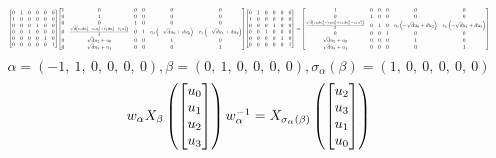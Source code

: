 \documentclass[11pt]{article}
\theoremstyle{definition}
\begin{document}
\[
\scaletoalign{\textwidth}{{\left[\begin{matrix}0 & 1 & 0 & 0 & 0 & 0\\1 & 0 & 0 & 0 & 0 & 0\\0 & 0 & 0 & 1 & 0 & 0\\0 & 0 & 1 & 0 & 0 & 0\\0 & 0 & 0 & 0 & 1 & 0\\0 & 0 & 0 & 0 & 0 & 1\end{matrix}\right]} {\left[\begin{matrix}1 & 0 & 0 & 0 & 0 & 0\\0 & 1 & 0 & 0 & 0 & 0\\0 & 0 & 1 & 0 & 0 & 0\\0 & \frac{\sqrt{d} \left(c_{0} d u_{2}^{2} - c_{0} u_{0}^{2} + c_{1} d u_{3}^{2} - c_{1} u_{1}^{2}\right)}{2} & 0 & 1 & c_{0} \left(- \sqrt{d} u_{0} + d u_{2}\right) & c_{1} \left(- \sqrt{d} u_{1} + d u_{3}\right)\\0 & \sqrt{d} u_{2} + u_{0} & 0 & 0 & 1 & 0\\0 & \sqrt{d} u_{3} + u_{1} & 0 & 0 & 0 & 1\end{matrix}\right]} {\left[\begin{matrix}0 & 1 & 0 & 0 & 0 & 0\\1 & 0 & 0 & 0 & 0 & 0\\0 & 0 & 0 & 1 & 0 & 0\\0 & 0 & 1 & 0 & 0 & 0\\0 & 0 & 0 & 0 & 1 & 0\\0 & 0 & 0 & 0 & 0 & 1\end{matrix}\right]} = {\left[\begin{matrix}1 & 0 & 0 & 0 & 0 & 0\\0 & 1 & 0 & 0 & 0 & 0\\\frac{\sqrt{d} \left(c_{0} d u_{2}^{2} - c_{0} u_{0}^{2} + c_{1} d u_{3}^{2} - c_{1} u_{1}^{2}\right)}{2} & 0 & 1 & 0 & c_{0} \left(- \sqrt{d} u_{0} + d u_{2}\right) & c_{1} \left(- \sqrt{d} u_{1} + d u_{3}\right)\\0 & 0 & 0 & 1 & 0 & 0\\\sqrt{d} u_{2} + u_{0} & 0 & 0 & 0 & 1 & 0\\\sqrt{d} u_{3} + u_{1} & 0 & 0 & 0 & 0 & 1\end{matrix}\right]}}
\]
\[
\alpha = \left( -1, \  1, \  0, \  0, \  0, \  0\right), \beta = \left( 0, \  1, \  0, \  0, \  0, \  0\right), \sigma_{\alpha}(\beta) = \left( 1, \  0, \  0, \  0, \  0, \  0\right)
\]
\[
\scaletoalign{\textwidth}{w_{\alpha} X_{\beta}\left(\left[\begin{matrix}u_{0}\\u_{1}\\u_{2}\\u_{3}\end{matrix}\right]\right) w_{\alpha}^{-1} = X_{\sigma_{\alpha}\left(\beta\right)}\left(\left[\begin{matrix}u_{2}\\u_{3}\\u_{1}\\u_{0}\end{matrix}\right]\right)}
\]
\end{document}
